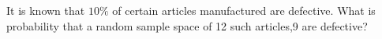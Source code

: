\documentclass[journal,12pt,twocolumn]{IEEEtran}
\theoremstyle{remark}
\begin{document}



\maketitle

\newpage


\bigskip

\renewcommand{\thefigure}{\theenumi}
\renewcommand{\thetable}{\theenumi}

 It is known that $10\%$ of certain articles manufactured are defective. What is probability that a random sample space of 12 such articles,9 are defective?
\end{document}
